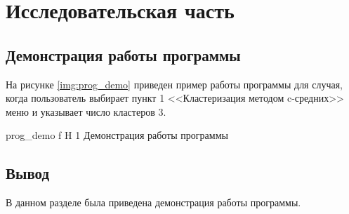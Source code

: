 \chapter{Исследовательская часть}

\section{Демонстрация работы программы}

На рисунке \ref{img:prog_demo} приведен пример работы программы для случая, когда пользователь выбирает пункт 1 <<Кластеризация методом c-средних>> меню и указывает число кластеров 3.

	{prog_demo}
	{f}
	{H}
	{1\textwidth}
	{Демонстрация работы программы}

\section{Вывод}

В данном разделе была приведена демонстрация работы программы.